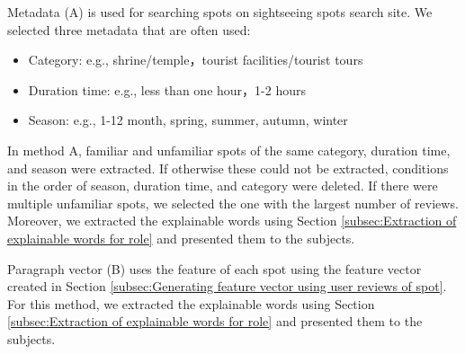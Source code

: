 \documentclass[journal]{IAENGtran}
\begin{document}
Metadata (A) is used for searching spots on sightseeing spots search site.
We selected three metadata that are often used:
\begin{itemize}
  \item Category: e.g., shrine/temple，tourist facilities/tourist tours
  \item Duration time: e.g., less than one hour，1-2 hours
  \item Season: e.g., 1-12 month, spring, summer, autumn, winter
\end{itemize}

In method A, familiar and unfamiliar spots of the same category, duration time, and season were extracted.
If otherwise these could not be extracted, conditions in the order of season, duration time, and category were deleted.
If there were multiple unfamiliar spots, we selected the one with the largest number of reviews.
Moreover, we extracted the explainable words using Section \ref{subsec:Extraction of explainable words for role} and presented them to the subjects.

Paragraph vector (B) uses the feature of each spot using the feature vector created in Section \ref{subsec:Generating feature vector using user reviews of spot}.
For this method, we extracted the explainable words using Section \ref{subsec:Extraction of explainable words for role} and presented them to the subjects.
\end{document}
